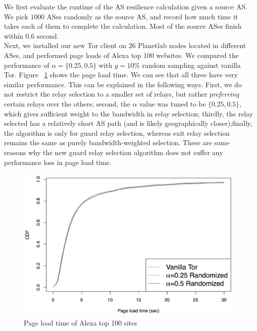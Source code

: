 We first evaluate the runtime of the AS resilience calculation given a source AS. We pick $1000$ ASes randomly as the source AS, and record how much time it takes each of them to complete the calculation. Most of the source ASes finish within $0.6$ second. \\


Next, we installed our new Tor client on $26$ Planetlab nodes located in different ASes, and performed page loads of Alexa top 100 websites. We compared the performance of $\alpha=\{0.25,0.5\}$ with $g=10\%$ random sampling against vanilla Tor. Figure ~\ref{fig_pageload} shows the page load time. We can see that all three have very similar performance. This can be explained in the following ways. First, we do not restrict the relay selection to a smaller set of relays, but rather \emph{preferring} certain relays over the others; second, the $\alpha$ value was tuned to be $\{0.25,0.5\}$, which gives sufficient weight to the bandwidth in relay selection; thirdly, the relay selected has a relatively short AS path (and is likely geographically closer);finally, the algorithm is only for guard relay selection, whereas exit relay selection remains the same as purely bandwidth-weighted selection. These are some reasons why the new guard relay selection algorithm does not suffer any performance loss in page load time. 

\begin{figure}[ht!]
\centering
\includegraphics[width=.4\textwidth]{figure/pageloadtime}
\caption{Page load time of Alexa top 100 sites \label{fig_pageload}}
\end{figure}



